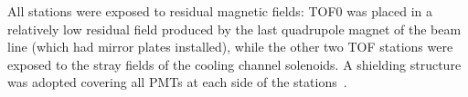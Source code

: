 
All stations were exposed to residual magnetic fields: TOF0 was placed in a relatively low residual field produced by the last quadrupole magnet of the beam line (which had mirror plates installed), while the other two TOF stations were exposed to the stray fields of the cooling channel solenoids. A shielding structure was adopted covering all PMTs at each side of the stations~\cite{2010NIMPA.615...14B}.


